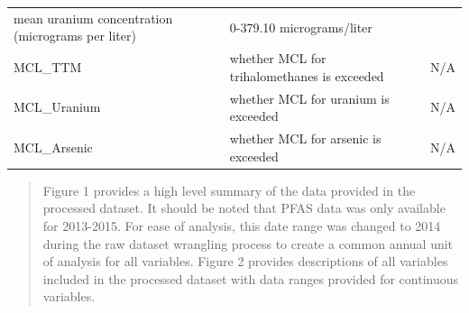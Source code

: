 \documentclass[12pt,]{article}
\begin{document}
\begin{longtable}[]{@{}lll@{}}
\begin{minipage}[t]{0.46\columnwidth}
mean uranium concentration (micrograms per liter)\strut
\end{minipage} & \begin{minipage}[t]{0.23\columnwidth}\raggedright
0-379.10 micrograms/liter\strut
\end{minipage}\tabularnewline
\begin{minipage}[t]{0.22\columnwidth}\raggedright
MCL\_TTM\strut
\end{minipage} & \begin{minipage}[t]{0.46\columnwidth}\raggedright
whether MCL for trihalomethanes is exceeded\strut
\end{minipage} & \begin{minipage}[t]{0.23\columnwidth}\raggedright
N/A\strut
\end{minipage}\tabularnewline
\begin{minipage}[t]{0.22\columnwidth}\raggedright
MCL\_Uranium\strut
\end{minipage} & \begin{minipage}[t]{0.46\columnwidth}\raggedright
whether MCL for uranium is exceeded\strut
\end{minipage} & \begin{minipage}[t]{0.23\columnwidth}\raggedright
N/A\strut
\end{minipage}\tabularnewline
\begin{minipage}[t]{0.22\columnwidth}\raggedright
MCL\_Arsenic\strut
\end{minipage} & \begin{minipage}[t]{0.46\columnwidth}\raggedright
whether MCL for arsenic is exceeded\strut
\end{minipage} & \begin{minipage}[t]{0.23\columnwidth}\raggedright
N/A\strut
\end{minipage}\tabularnewline
\bottomrule
\end{longtable}

\begin{quote}
Figure 1 provides a high level summary of the data provided in the
processed dataset. It should be noted that PFAS data was only available
for 2013-2015. For ease of analysis, this date range was changed to 2014
during the raw dataset wrangling process to create a common annual unit
of analysis for all variables. Figure 2 provides descriptions of all
variables included in the processed dataset with data ranges provided
for continuous variables.
\end{quote}

\newpage
\end{document}
